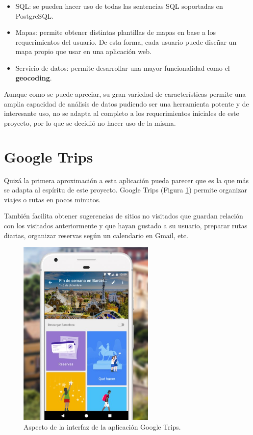 \begin{itemize}
	\item SQL: se pueden hacer uso de todas las sentencias SQL soportadas en PostgreSQL.
	\item Mapas: permite obtener distintas plantillas de mapas en base a los requerimientos del usuario. De esta forma, cada usuario puede diseñar un mapa propio que usar en una aplicación web.
	\item Servicio de datos: permite desarrollar una mayor funcionalidad como el \textbf{geocoding}.
\end{itemize}

Aunque como se puede apreciar, su gran variedad de características permite una amplia capacidad de análisis de datos pudiendo ser una herramienta potente y de interesante uso, no se adapta al completo a los requerimientos iniciales de este proyecto, por lo que se decidió no hacer uso de la misma.

\section{Google Trips}

Quizá la primera aproximación a esta aplicación pueda parecer que es la que más se adapta al espíritu de este proyecto. Google Trips (Figura \ref{trips}) permite organizar viajes o rutas en pocos minutos.

También facilita obtener sugerencias de sitios no visitados que guardan relación con los visitados anteriormente y que hayan gustado a su usuario, preparar rutas diarias, organizar reservas según un calendario en Gmail, etc.

\begin{figure}[h]
  \centering
    \includegraphics[width=0.6\textwidth]{../img/weka/trips.jpg}
  \caption{Aspecto de la interfaz de la aplicación Google Trips.}
  \label{trips}
\end{figure}

